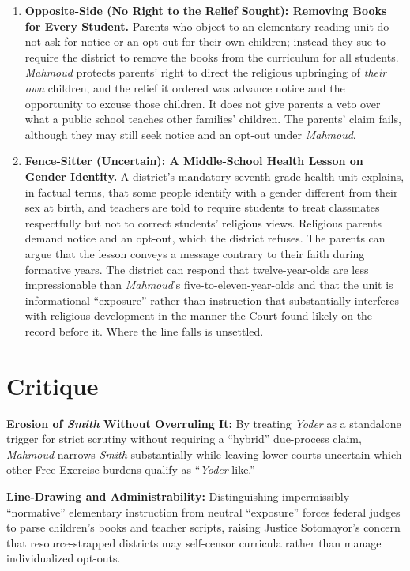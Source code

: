 \documentclass[12pt]{article}
\begin{document}
\begin{enumerate}
\item \textbf{Opposite-Side (No Right to the Relief Sought): Removing Books for Every Student.} Parents who object to an elementary reading unit do not ask for notice or an opt-out for their own children; instead they sue to require the district to remove the books from the curriculum for all students. \textit{Mahmoud} protects parents' right to direct the religious upbringing of \textit{their own} children, and the relief it ordered was advance notice and the opportunity to excuse those children. It does not give parents a veto over what a public school teaches other families' children. The parents' claim fails, although they may still seek notice and an opt-out under \textit{Mahmoud}.

\item \textbf{Fence-Sitter (Uncertain): A Middle-School Health Lesson on Gender Identity.} A district's mandatory seventh-grade health unit explains, in factual terms, that some people identify with a gender different from their sex at birth, and teachers are told to require students to treat classmates respectfully but not to correct students' religious views. Religious parents demand notice and an opt-out, which the district refuses. The parents can argue that the lesson conveys a message contrary to their faith during formative years. The district can respond that twelve-year-olds are less impressionable than \textit{Mahmoud}'s five-to-eleven-year-olds and that the unit is informational ``exposure'' rather than instruction that substantially interferes with religious development in the manner the Court found likely on the record before it. Where the line falls is unsettled.

\end{enumerate}

\section{Critique}
\textbf{Erosion of \textit{Smith} Without Overruling It:} By treating \textit{Yoder} as a standalone trigger for strict scrutiny without requiring a ``hybrid'' due-process claim, \textit{Mahmoud} narrows \textit{Smith} substantially while leaving lower courts uncertain which other Free Exercise burdens qualify as ``\textit{Yoder}-like.''

\textbf{Line-Drawing and Administrability:} Distinguishing impermissibly ``normative'' elementary instruction from neutral ``exposure'' forces federal judges to parse children's books and teacher scripts, raising Justice Sotomayor's concern that resource-strapped districts may self-censor curricula rather than manage individualized opt-outs.
\end{document}
